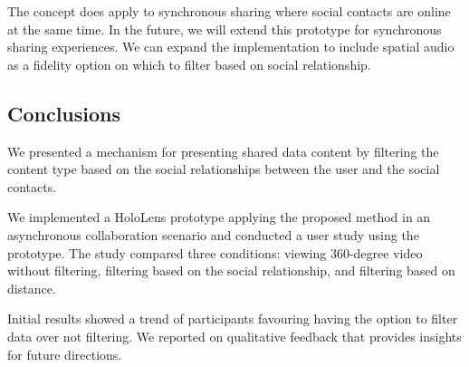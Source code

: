 The concept does apply to synchronous sharing where social contacts are online at the same time. In the future, we will extend this prototype for synchronous sharing experiences. We can expand the implementation to include spatial audio as a fidelity option on which to filter based on social relationship. 


\subsection{Conclusions}

We presented a mechanism for presenting shared data content by filtering the content type based on the social relationships between the user and the social contacts. 

We implemented a HoloLens prototype applying the proposed method in an asynchronous collaboration scenario and conducted a user study using the prototype. The study compared three conditions: viewing 360-degree video without filtering, filtering based on the social relationship, and filtering based on distance.

Initial results showed a trend of participants favouring having the option to filter data over not filtering. We reported on qualitative feedback that provides insights for future directions. 
